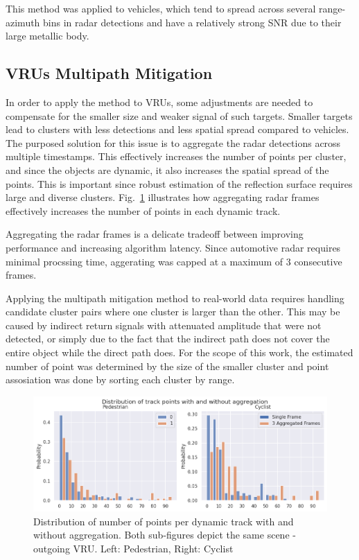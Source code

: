 \documentclass[../main.tex]{subfiles}
\begin{document}
This method was applied to vehicles, which tend to spread across several range-azimuth bins in radar detections and have a relatively strong SNR due to their large metallic body.

\subsection*{VRUs Multipath Mitigation}
In order to apply  the method to VRUs, some adjustments are needed to compensate for the smaller size and weaker signal of such targets. Smaller targets lead to clusters with less detections and less spatial spread compared to vehicles. The purposed solution for this issue is to aggregate the radar detections across multiple timestamps. 
This effectively increases the number of points per cluster, and since the objects are dynamic, it also increases the spatial spread of the points. This is important since robust estimation of the reflection surface requires large and diverse clusters.
Fig.~\ref{fig:agg} illustrates how aggregating radar frames effectively increases the number of points in each dynamic track.

\par
Aggregating the radar frames is a delicate tradeoff between improving performance and increasing algorithm latency. Since automotive radar requires minimal procssing time, aggerating was capped at a maximum of 3 consecutive frames.\\

\par
Applying the multipath mitigation method to real-world data requires handling candidate cluster pairs where one cluster is larger than the other. This may be caused by indirect return signals with attenuated amplitude that were not detected, or simply due to the fact that the indirect path does not cover the entire object while the direct path does. 
For the scope of this work, the estimated number of point was determined by the size of the smaller cluster and point assosiation was done by sorting each cluster by range.

\begin{figure}[htbp]
\centerline{\includegraphics[scale=0.33]{figures/fig_aggregation2.png}}
\caption{Distribution of number of points per dynamic track with and without aggregation. Both sub-figures depict the same scene - outgoing VRU. Left: Pedestrian, Right: Cyclist}
\label{fig:agg}
\end{figure}
\end{document}
